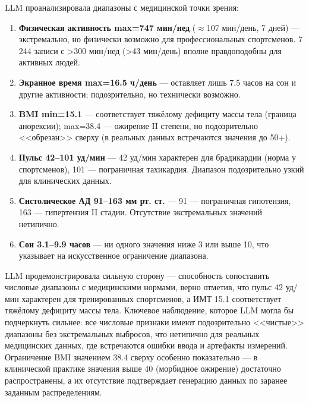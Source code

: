 \documentclass[12pt, a4paper]{article}
\begin{document}
\begin{responsebox}
LLM проанализировала диапазоны с медицинской точки зрения:

\begin{enumerate}
    \item \textbf{Физическая активность max=747 мин/нед} ($\approx$107 мин/день, 7 дней) --- экстремально, но физически возможно для профессиональных спортсменов. 7\,244 записи с >300 мин/нед (>43 мин/день) вполне правдоподобны для активных людей.
    \item \textbf{Экранное время max=16.5 ч/день} --- оставляет лишь 7.5 часов на сон и другие активности; подозрительно, но технически возможно.
    \item \textbf{BMI min=15.1} --- соответствует тяжёлому дефициту массы тела (граница анорексии); max=38.4 --- ожирение II степени, но подозрительно <<обрезан>> сверху (в реальных данных встречаются значения до 50+).
    \item \textbf{Пульс 42--101 уд/мин} --- 42 уд/мин характерен для брадикардии (норма у спортсменов), 101 --- пограничная тахикардия. Диапазон подозрительно узкий для клинических данных.
    \item \textbf{Систолическое АД 91--163 мм рт. ст.} --- 91 --- пограничная гипотензия, 163 --- гипертензия II стадии. Отсутствие экстремальных значений нетипично.
    \item \textbf{Сон 3.1--9.9 часов} --- ни одного значения ниже 3 или выше 10, что указывает на искусственное ограничение диапазона.
\end{enumerate}
\end{responsebox}

\begin{commentbox}
LLM продемонстрировала сильную сторону --- способность сопоставить числовые диапазоны с медицинскими нормами, верно отметив, что пульс 42 уд/мин характерен для тренированных спортсменов, а ИМТ 15.1 соответствует тяжёлому дефициту массы тела. Ключевое наблюдение, которое LLM могла бы подчеркнуть сильнее: все числовые признаки имеют подозрительно <<чистые>> диапазоны без экстремальных выбросов, что нетипично для реальных медицинских данных, где встречаются ошибки ввода и артефакты измерений. Ограничение BMI значением 38.4 сверху особенно показательно --- в клинической практике значения выше 40 (морбидное ожирение) достаточно распространены, а их отсутствие подтверждает генерацию данных по заранее заданным распределениям.
\end{commentbox}
\end{document}
